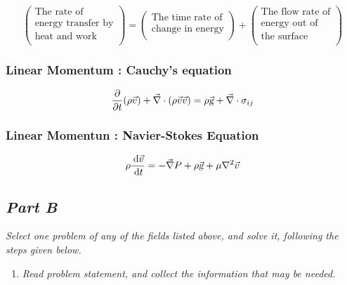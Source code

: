 \documentclass{article}
\newcommand{\ud}{\,\mathrm{d}}
\begin{document}
$$ \left(
    \begin{array}{c}
        \textrm{The rate of} \\
        \textrm{energy transfer by} \\
        \textrm{heat and work} \\
    \end{array}
\right) = \left(
    \begin{array}{c}
        \textrm{The time rate of} \\
        \textrm{change in energy} \\
    \end{array}
\right) + \left(
    \begin{array}{c}
        \textrm{The flow rate of} \\
        \textrm{energy out of} \\
        \textrm{the surface} \\
    \end{array}
\right) $$

\subsubsection*{Linear Momentum : Cauchy's equation}

\begin{equation}
\frac{\partial}{\partial t} (\rho \vec{v}) + \vec{\nabla} \cdot (\rho \vec{v} \vec{v}) = \rho \vec{\textsl{g}} + \vec{\nabla} \cdot \sigma_{ij}
\end{equation}

\subsubsection*{Linear Momentun : Navier-Stokes Equation}

\begin{equation}
\rho \frac{\ud \vec{v}}{\ud t} = - \vec{\nabla} P + \rho \vec{\textsl{g}} + \mu \nabla^2 \vec{v}
\end{equation}

\subsection*{\emph{Part B}}
\textit{Select one problem of any of the fields listed above, and solve it, following the steps given below.}

\begin{enumerate}
\item \textit{Read problem statement, and collect the information that may be needed.}
\end{enumerate}
\end{document}
